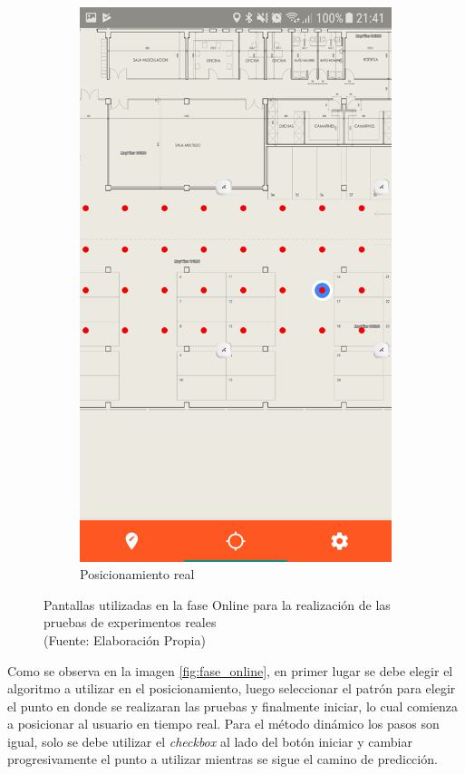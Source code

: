 \begin{figure}[ht!]
\begin{subfigure}{.3\textwidth}
  \includegraphics[width=.8\linewidth]{figures/fase_online3.png}
  \caption{Posicionamiento real}
  \label{fig:online3}
\end{subfigure}
\caption[Pantallas utilizadas en la fase Online para la realización de las pruebas]{Pantallas utilizadas en la fase Online para la realización de las pruebas de experimentos reales \\
{\scriptsize (Fuente: Elaboración Propia)}}
\label{fig:fase_online}
\end{figure}

Como se observa en la imagen \autoref{fig:fase_online}, en primer lugar se debe elegir el algoritmo a utilizar en el posicionamiento, luego seleccionar el patrón para elegir el punto en donde se realizaran las pruebas y finalmente iniciar, lo cual comienza a posicionar al usuario en tiempo real. Para el método dinámico los pasos son igual, solo se debe utilizar el \textit{checkbox} al lado del botón iniciar y cambiar progresivamente el punto a utilizar mientras se sigue el camino de predicción.

